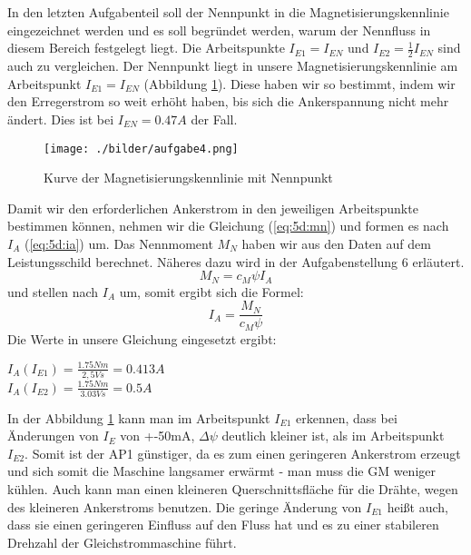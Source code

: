 \section{}
In den letzten Aufgabenteil soll der Nennpunkt in die Magnetisierungskennlinie eingezeichnet werden und es soll begründet werden, warum der Nennfluss in diesem Bereich festgelegt liegt. Die Arbeitspunkte $ I_{E1} = I_{EN} $ und $ I_{E2} = \frac{1}{2} I_{EN} $ sind auch zu vergleichen.
Der Nennpunkt liegt in unsere Magnetisierungskennlinie am Arbeitspunkt $ I_{E1} = I_{EN} $ (Abbildung \ref{fig:5d:kennlineNenn}). Diese haben wir so bestimmt, indem wir den Erregerstrom so weit erhöht haben, bis sich die Ankerspannung nicht mehr ändert. Dies ist bei $ I_{EN} = 0.47A $ der Fall.
\begin{figure}[h]
	\centering
	\texttt{[image: ./bilder/aufgabe4.png]}
	\caption{Kurve der Magnetisierungskennlinie mit Nennpunkt}
	\label{fig:5d:kennlineNenn}
\end{figure}

Damit wir den erforderlichen Ankerstrom in den jeweiligen Arbeitspunkte bestimmen können, nehmen wir die Gleichung (\ref{eq:5d:mn}) und formen es nach $ I_{A} $ (\ref{eq:5d:ia}) um. Das Nennmoment $ M_{N} $ haben wir aus den Daten auf dem Leistungsschild berechnet. Näheres dazu wird in der Aufgabenstellung 6 erläutert.
\begin{equation}
	M_{N} = c_{M}\psi I_{A}
	\label{eq:5d:mn}
\end{equation} und stellen nach $ I_{A} $ um, somit ergibt sich die Formel:
\begin{equation}
	I_{A} = \frac{M_{N}}{c_{M}\psi}
	\label{eq:5d:ia}
\end{equation}
Die Werte in unsere Gleichung eingesetzt ergibt:
\begin{center}
	$ I_{A}(I_{E1}) = \frac{1.75Nm}{2,5Vs} = 0.413A $ \\
	$ I_{A}(I_{E2}) = \frac{1.75Nm}{3.03Vs} = 0.5A $
\end{center}

In der Abbildung \ref{fig:5d:kennlineNenn} kann man im Arbeitspunkt $ I_{E1} $ erkennen, dass bei Änderungen von $ I_{E} $ von +-50mA, $ \Delta\psi $ deutlich kleiner ist, als im Arbeitspunkt $ I_{E2} $. Somit ist der AP1 günstiger, da es zum einen geringeren Ankerstrom erzeugt und sich somit die Maschine langsamer erwärmt - man muss die GM weniger kühlen. Auch kann man einen kleineren Querschnittsfläche für die Drähte, wegen des kleineren Ankerstroms benutzen. Die geringe Änderung von $ I_{E1} $ heißt auch, dass sie einen geringeren Einfluss auf den Fluss hat und es zu einer stabileren Drehzahl der Gleichstrommaschine führt.
